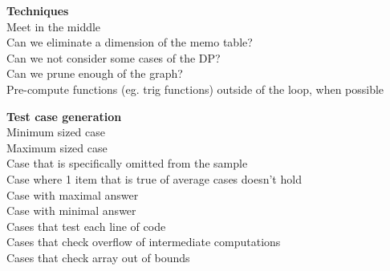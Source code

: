 \textbf{Techniques} \\ 
Meet in the middle \\
Can we eliminate a dimension of the memo table? \\
Can we not consider some cases of the DP? \\
Can we prune enough of the graph? \\
Pre-compute functions (eg. trig functions) outside of the loop, when possible 

\textbf{Test case generation} \\
Minimum sized case \\
Maximum sized case \\
Case that is specifically omitted from the sample \\
Case where 1 item that is true of average cases doesn't hold \\
Case with maximal answer \\
Case with minimal answer \\
Cases that test each line of code \\
Cases that check overflow of intermediate computations \\
Cases that check array out of bounds

\newpage